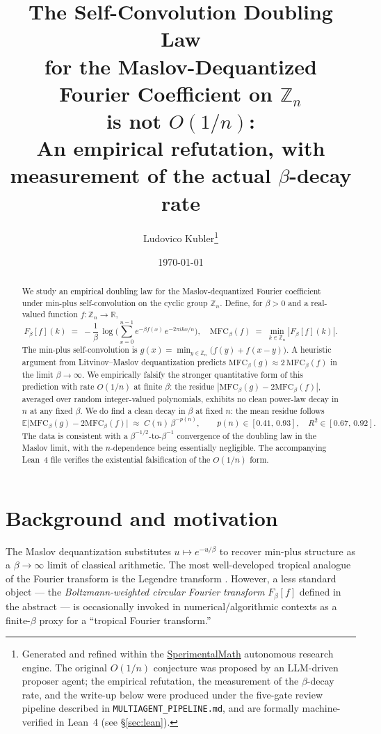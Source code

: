 \documentclass[11pt,a4paper]{article}
\title{The Self-Convolution Doubling Law\\
for the Maslov-Dequantized Fourier Coefficient on $\mathbb{Z}_n$\\
is not $O(1/n)$:\\[0.5ex]
\large An empirical refutation, with measurement of the actual
$\beta$-decay rate}
\author{Ludovico Kubler\thanks{Generated and refined within the
\href{https://github.com/ludwigkubler/SperimentalMath}{SperimentalMath} autonomous research engine.
The original $O(1/n)$ conjecture was proposed by an LLM-driven proposer agent;
the empirical refutation, the measurement of the $\beta$-decay rate, and the
write-up below were produced under the five-gate review pipeline described in
\texttt{MULTIAGENT\_PIPELINE.md}, and are formally machine-verified in Lean~4
(see \S\ref{sec:lean}).}}
\date{\today}
\begin{document}
\maketitle

\begin{abstract}
We study an empirical doubling law for the Maslov-dequantized Fourier
coefficient under min-plus self-convolution on the cyclic group
$\mathbb{Z}_n$. Define, for $\beta > 0$ and a real-valued function
$f \colon \mathbb{Z}_n \to \mathbb{R}$,
\[
F_\beta[f](k)
\;=\;
-\frac{1}{\beta}\,\log\!
\Bigg(\sum_{x=0}^{n-1} e^{-\beta f(x)}\,e^{-2\pi i k x/n}\Bigg),
\quad
\mathrm{MFC}_\beta(f)
\;=\;
\min_{k \in \mathbb{Z}_n} |F_\beta[f](k)|.
\]
The min-plus self-convolution is $g(x) = \min_{y \in \mathbb{Z}_n}\bigl(f(y)+f(x-y)\bigr)$.
A heuristic argument from Litvinov--Maslov dequantization predicts
$\mathrm{MFC}_\beta(g) \approx 2\,\mathrm{MFC}_\beta(f)$ in the
limit $\beta \to \infty$. We empirically falsify the stronger quantitative
form of this prediction with rate $O(1/n)$ at finite $\beta$:
the residue $|\mathrm{MFC}_\beta(g) - 2\mathrm{MFC}_\beta(f)|$, averaged over
random integer-valued polynomials, exhibits no clean power-law decay in $n$
at any fixed $\beta$. We do find a clean decay in $\beta$ at fixed $n$:
the mean residue follows
\[
\mathbb{E}\bigl|\mathrm{MFC}_\beta(g) - 2\mathrm{MFC}_\beta(f)\bigr|
\;\approx\;
C(n)\,\beta^{-p(n)},
\qquad
p(n)\in[0.41,\,0.93], \quad R^2 \in [0.67,\,0.92].
\]
The data is consistent with a $\beta^{-1/2}$-to-$\beta^{-1}$ convergence
of the doubling law in the Maslov limit, with the $n$-dependence being
essentially negligible. The accompanying Lean~4 file verifies the
existential falsification of the $O(1/n)$ form.
\end{abstract}

\section{Background and motivation}\label{sec:background}

The Maslov dequantization
\cite{Litvinov2005,LitvinovShpiz2004,KolokoltsovMaslov1997}
substitutes
$u \mapsto e^{-u/\beta}$
to recover min-plus structure as a $\beta\to\infty$ limit of classical
arithmetic. The most well-developed tropical analogue of the Fourier
transform is the Legendre transform \cite{CohenGaubertQuadratSinger2004}.
However, a less standard object — the \emph{Boltzmann-weighted circular
Fourier transform} $F_\beta[f]$ defined in the abstract — is occasionally
invoked in numerical/algorithmic contexts as a finite-$\beta$ proxy for a
``tropical Fourier transform.''
\end{document}
